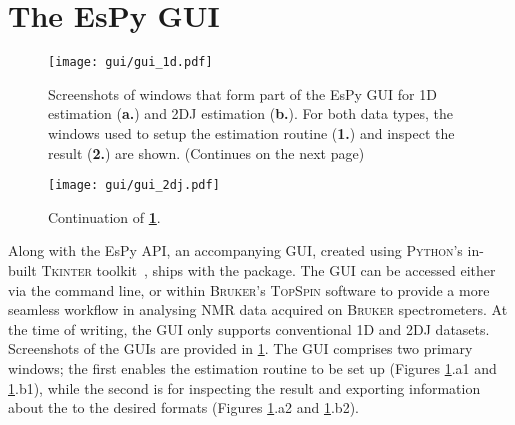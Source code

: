 \section{The \acs{EsPy} \acs{GUI}}
\begin{figure}
    \centering
    \texttt{[image: gui/gui\_1d.pdf]}
    \caption[
        Screenshots of the \acs{EsPy} \acs{GUI} for \acs{1D} and \acs{2DJ} estimation.
    ]{
        Screenshots of windows that form part of the \ac{EsPy} \ac{GUI} for
        \ac{1D} estimation (\textbf{a.}) and \ac{2DJ} estimation (\textbf{b.}).
        For both data types, the windows used to setup the estimation routine
        (\textbf{1.}) and inspect the result (\textbf{2.}) are shown.
        (Continues on the next page)
    }
    \label{fig:gui}
\end{figure}
\begin{figure}%
    \ContinuedFloat
    \centering
    \texttt{[image: gui/gui\_2dj.pdf]}
    \caption*{Continuation of \textbf{\cref{fig:gui}}.}
\end{figure}
Along with the \ac{EsPy} \ac{API}, an accompanying \ac{GUI}, created using
\textsc{Python}'s in-built \textsc{Tkinter} toolkit~\cite{tkinter}, ships with
the package. The \ac{GUI} can be accessed either via the command line, or within
\textsc{Bruker}'s \textsc{TopSpin} software to provide a more seamless workflow
in analysing \ac{NMR} data acquired on \textsc{Bruker} spectrometers.
At the time of writing, the \ac{GUI} only supports conventional \ac{1D}
and \ac{2DJ} datasets. Screenshots of the \acp{GUI} are provided in
\cref{fig:gui}.
The \ac{GUI} comprises two primary windows; the first enables the estimation
routine to be set up (Figures \ref{fig:gui}.a1 and \ref{fig:gui}.b1), while the
second is for inspecting the result and exporting information about the to the
desired formats (Figures \ref{fig:gui}.a2 and \ref{fig:gui}.b2).

